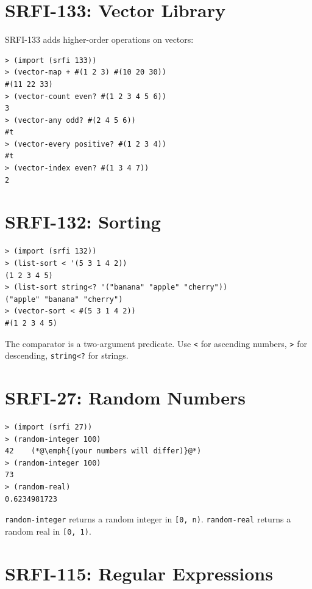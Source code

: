 \section{SRFI-133: Vector Library}

SRFI-133 adds higher-order operations on vectors:

\begin{lstlisting}[style=repl]
> (import (srfi 133))
> (vector-map + #(1 2 3) #(10 20 30))
#(11 22 33)
> (vector-count even? #(1 2 3 4 5 6))
3
> (vector-any odd? #(2 4 5 6))
#t
> (vector-every positive? #(1 2 3 4))
#t
> (vector-index even? #(1 3 4 7))
2
\end{lstlisting}

\section{SRFI-132: Sorting}

\begin{lstlisting}[style=repl]
> (import (srfi 132))
> (list-sort < '(5 3 1 4 2))
(1 2 3 4 5)
> (list-sort string<? '("banana" "apple" "cherry"))
("apple" "banana" "cherry")
> (vector-sort < #(5 3 1 4 2))
#(1 2 3 4 5)
\end{lstlisting}

The comparator is a two-argument predicate. Use \texttt{<} for ascending numbers, \texttt{>} for descending, \texttt{string<?} for strings.

\section{SRFI-27: Random Numbers}

\begin{lstlisting}[style=repl]
> (import (srfi 27))
> (random-integer 100)
42    (*@\emph{(your numbers will differ)}@*)
> (random-integer 100)
73
> (random-real)
0.6234981723
\end{lstlisting}

\texttt{random-integer} returns a random integer in \texttt{[0, n)}. \texttt{random-real} returns a random real in \texttt{[0, 1)}.

\section{SRFI-115: Regular Expressions}

